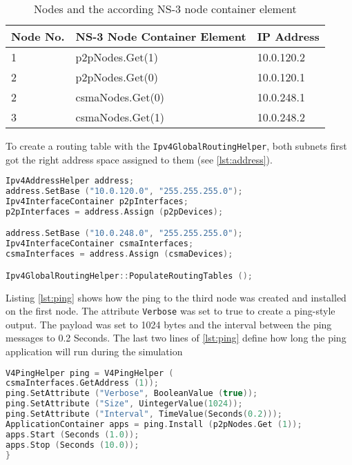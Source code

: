 \documentclass[parskip=full]{scrartcl}
\begin{document}
\begin{table}[hb]
	\centering
	\begin{tabular}{lll}
		\toprule
		\textbf{Node No.} & \textbf{NS-3 Node Container Element} & \textbf{IP Address}\\ \midrule
		1 & p2pNodes.Get(1) & 10.0.120.2 \\
		2 & p2pNodes.Get(0) & 10.0.120.1 \\
		2 & csmaNodes.Get(0) & 10.0.248.1 \\
		3 & csmaNodes.Get(1) & 10.0.248.2 \\
		\bottomrule
	\end{tabular}
	\caption{Nodes and the according NS-3 node container element}
	\label{tab:Nodes}
\end{table}
\clearpage

To create a routing table with the \verb|Ipv4GlobalRoutingHelper|, both subnets first got the right address space assigned to them (see \ref{lst:address}).

\begin{lstlisting}[language=c++, frame=single, captionpos=b, caption={IP address assignment and routing table creation}, label=lst:address]
Ipv4AddressHelper address;
address.SetBase ("10.0.120.0", "255.255.255.0");
Ipv4InterfaceContainer p2pInterfaces;
p2pInterfaces = address.Assign (p2pDevices);

address.SetBase ("10.0.248.0", "255.255.255.0");
Ipv4InterfaceContainer csmaInterfaces;
csmaInterfaces = address.Assign (csmaDevices);

Ipv4GlobalRoutingHelper::PopulateRoutingTables ();
\end{lstlisting}

Listing \ref{lst:ping} shows how the ping to the third node was created and installed on the first node. 
The attribute \verb|Verbose| was set to true to create a ping-style output. 
The payload was set to 1024 bytes and the interval between the ping messages to 0.2 Seconds.
The last two lines of \cref{lst:ping} define how long the ping application will run during the simulation

\begin{lstlisting}[language=c++, frame=single , captionpos=b, label=lst:ping]
V4PingHelper ping = V4PingHelper (
csmaInterfaces.GetAddress (1));
ping.SetAttribute ("Verbose", BooleanValue (true));
ping.SetAttribute ("Size", UintegerValue(1024));
ping.SetAttribute ("Interval", TimeValue(Seconds(0.2)));
ApplicationContainer apps = ping.Install (p2pNodes.Get (1));
apps.Start (Seconds (1.0));
apps.Stop (Seconds (10.0));
}
\end{lstlisting}
\end{document}
